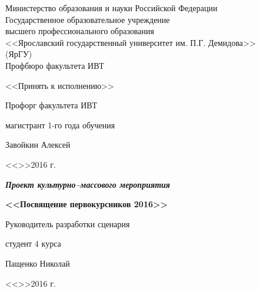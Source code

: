 \documentclass[a4paper, 12pt]{extarticle}
\begin{document}
\setcounter{tocdepth}{3}





{
\thispagestyle{empty}

\begin{center}
	
	Министерство образования и науки Российской Федерации\\[0.3cm]
	Государственное образовательное учреждение\\
	высшего профессионального образования\\
	<<Ярославский государственный университет им. П.Г. Демидова>>\\
	(ЯрГУ)\\[0.3cm]
	
	Профбюро факультета ИВТ
	
	\bigskip
	\bigskip	
	
	\hspace{27em}<<Принять к исполнению>>
	
	\begin{flushright}
		Профорг факультета ИВТ\par
		магистрант 1-го года обучения\par
		\underline{\hspace{3.2cm}}Завойкин Алексей\par
		<<\underline{\hspace{0.5cm}}>>\underline{\hspace{3.4cm}}2016 г.\par
	\end{flushright}
	
	\bigskip
	
	{\textbf
		{\textit
			{Проект культурно--массового мероприятия}
		}
	}
	\\
	
	\bigskip
	\bigskip
	
	{\bf
		<<Посвящение первокурсников 2016>> 
	}
\end{center}

\medskip

\begin{flushright}
	Руководитель разработки сценария\par
	студент 4 курса\par
	\underline{\hspace{3.5cm}}Пащенко Николай\par
	<<\underline{\hspace{0.8cm}}>>\underline{\hspace{3.5cm}}2016 г.\par
\end{flushright}

}
\end{document}
